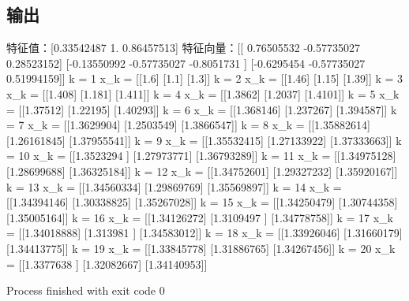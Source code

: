 \subsection{输出}
\begin{python}
特征值：[0.33542487 1.         0.86457513]
特征向量：[[ 0.76505532 -0.57735027  0.28523152]
 [-0.13550992 -0.57735027 -0.8051731 ]
 [-0.6295454  -0.57735027  0.51994159]]
k = 1
x_k = [[1.6]
 [1.1]
 [1.3]]
k = 2
x_k = [[1.46]
 [1.15]
 [1.39]]
k = 3
x_k = [[1.408]
 [1.181]
 [1.411]]
k = 4
x_k = [[1.3862]
 [1.2037]
 [1.4101]]
k = 5
x_k = [[1.37512]
 [1.22195]
 [1.40293]]
k = 6
x_k = [[1.368146]
 [1.237267]
 [1.394587]]
k = 7
x_k = [[1.3629904]
 [1.2503549]
 [1.3866547]]
k = 8
x_k = [[1.35882614]
 [1.26161845]
 [1.37955541]]
k = 9
x_k = [[1.35532415]
 [1.27133922]
 [1.37333663]]
k = 10
x_k = [[1.3523294 ]
 [1.27973771]
 [1.36793289]]
k = 11
x_k = [[1.34975128]
 [1.28699688]
 [1.36325184]]
k = 12
x_k = [[1.34752601]
 [1.29327232]
 [1.35920167]]
k = 13
x_k = [[1.34560334]
 [1.29869769]
 [1.35569897]]
k = 14
x_k = [[1.34394146]
 [1.30338825]
 [1.35267028]]
k = 15
x_k = [[1.34250479]
 [1.30744358]
 [1.35005164]]
k = 16
x_k = [[1.34126272]
 [1.3109497 ]
 [1.34778758]]
k = 17
x_k = [[1.34018888]
 [1.313981  ]
 [1.34583012]]
k = 18
x_k = [[1.33926046]
 [1.31660179]
 [1.34413775]]
k = 19
x_k = [[1.33845778]
 [1.31886765]
 [1.34267456]]
k = 20
x_k = [[1.3377638 ]
 [1.32082667]
 [1.34140953]]

Process finished with exit code 0

\end{python}